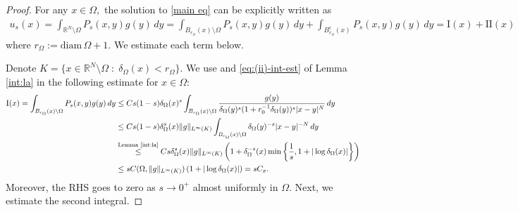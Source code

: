 \documentclass[notitlepage,11pt,reqno]{amsart}
\theoremstyle{definition}
\numberwithin{equation}{section}
\newcommand{\RR}{\mathds{R}}
\begin{document}
\begin{proof} For any $x\in \Omega,$ the solution to \eqref{main eq} can be explicitly written as
\begin{align*}
u_s(x)=\int_{\RR^N\setminus \Omega}P_s(x, y)g(y)\, dy=\int_{B_{r_{\Omega}}(x)\setminus \Omega}P_s(x, y)g(y)\,dy+\int_{B^c_{r_{\Omega}}(x)}P_s(x, y)g(y)\,dy=\mathrm I(x)+\mathrm {II} (x)
\end{align*}
where $r_{\Omega}:=\text{diam}\,\Omega+1.$ We estimate each term below.

\vspace{.5cm}
 Denote $K=\{x\in \RR^N\setminus \Omega\;:\; \delta_{\Omega}(x)<r_{\Omega}\}.$ We use \cite[Theorem 2.10]{Chen99} and \eqref{eq:(ii)-int-est} of Lemma \ref{int:la} in the following estimate for $x \in \Omega$:
\begin{align*}
\mathrm{I}(x)=\int_{B_{r_{\Omega}}(x)\setminus \Omega}P_s(x, y)g(y)\,dy &\leq C s(1-s)\delta_{\Omega}(x)^s \int_{B_{r_{\Omega}}(x)\setminus \Omega} \frac{g(y)}{\delta_{\Omega}(y)^s(1+r^{-1}_0\delta_{\Omega}(y))^s|x-y|^N}\,dy\\
&\leq C s(1-s)\delta^s_{\Omega}(x)\|g\|_{L^{\infty}(K)}\int_{B_{r_{\Omega}}(x)\setminus \Omega} \delta_{\Omega}(y)^{-s}|x-y|^{-N}\,dy\\
&\overset{\text{Lemma \ref{int:la}}}{\leq} C s \delta^s_{\Omega}(x)\|g\|_{L^{\infty}(K)}\left(1+\delta^{-s}_{\Omega}(x)\min\left\{\frac{1}{s}, 1+|\log\delta_{\Omega}(x)|\right\}\right)\\
&\leq s C(\Omega, \|g\|_{L^{\infty}(K)}) \left(1+|\log \delta_{\Omega}(x)|\right)=sC_x. 
\end{align*}
Moreover, the RHS goes to zero as $s \to 0^+$ almost uniformly in $\Omega$. Next, we estimate the second integral.


\end{proof}
\end{document}
